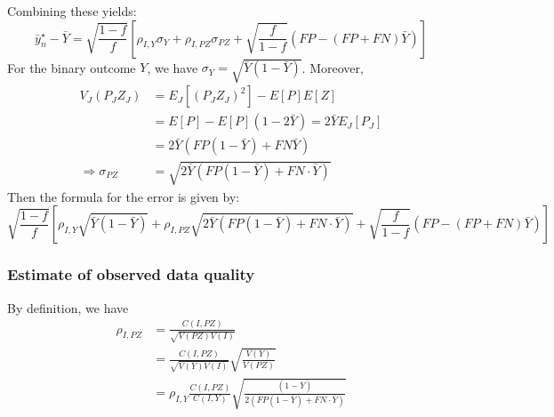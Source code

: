 \documentclass[12pt]{article}
\begin{document}
Combining these yields:
$$
\bar y_n^\star - \bar Y = \sqrt{\frac{1-f}{f}} \left[\rho_{I,Y} \sigma_Y + \rho_{I, PZ} \sigma_{PZ} + \sqrt{\frac{f}{1-f}} \left( FP - (FP+FN) \bar Y \right) \right]
$$
For the binary outcome $Y$, we have $\sigma_Y = \sqrt{\bar Y (1-\bar Y)}$. Moreover,
$$
\begin{aligned}
V_J(P_J Z_J) &= E_J[(P_J Z_J)^2] - E[P] E[Z] \\
&= E[P] - E[P] (1 - 2 \bar Y) = 2 \bar Y E_J [ P_J ] \\
&= 2 \bar Y \left( FP (1-\bar Y) + FN \bar Y \right) \\
\Rightarrow \sigma_{PZ} &= \sqrt{ 2 \bar Y \left( FP (1-\bar Y) + FN \cdot  \bar Y \right) }
\end{aligned}
$$
Then the formula for the error is given by:
$$
\sqrt{\frac{1-f}{f}} \left[\rho_{I,Y} \sqrt{\bar Y (1-\bar Y)} + \rho_{I, PZ} \sqrt{ 2 \bar Y \left( FP (1-\bar Y) + FN \cdot \bar Y \right )} + \sqrt{\frac{f}{1-f}} \left( FP - (FP+FN) \bar Y \right) \right]
$$

\subsubsection*{Estimate of observed data quality}

By definition, we have
$$
\begin{aligned}
\rho_{I,PZ} &= \frac{C(I, PZ)}{\sqrt{V(PZ) V(I)}} \\
&= \frac{C(I, PZ)}{\sqrt{V(Y) V(I)}} \sqrt{\frac{V(Y)}{V(PZ)}} \\
&= \rho_{I,Y} \frac{C(I,PZ)}{C(I,Y)} \sqrt{ \frac{(1-\bar Y)}{2 ( FP (1-\bar Y) + FN \cdot \bar Y)} }
\end{aligned}
$$
\end{document}
